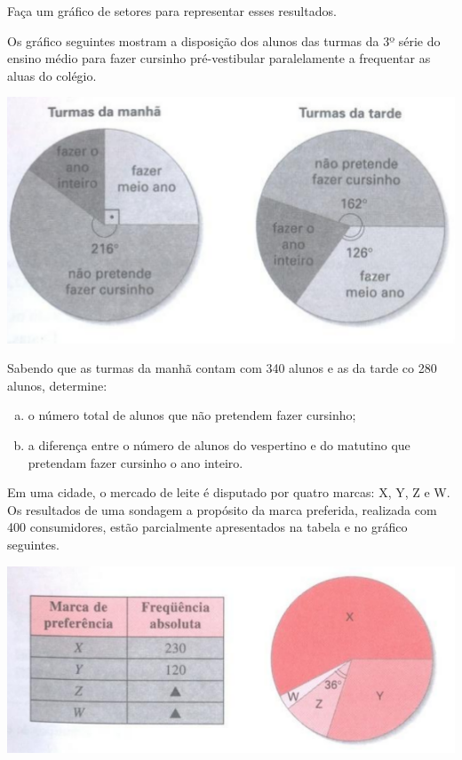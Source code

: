 	Faça um gráfico de setores para representar esses resultados.
	
	\item Os gráfico seguintes mostram a disposição dos alunos das turmas da 3º série do ensino médio para fazer cursinho pré-vestibular paralelamente a frequentar as aluas do colégio.
	
	\begin{center}
		\includegraphics[scale=0.7]{figuras/fig111.png}
	\end{center}	
	
	Sabendo que as turmas da manhã contam com 340 alunos e as da tarde co 280 alunos, determine:
	\begin{enumerate}[a)]
		\item o número total de alunos que não pretendem fazer cursinho;
		\item a diferença entre o número de alunos do vespertino e do matutino que pretendam fazer cursinho o ano inteiro.
	\end{enumerate}
	
	\item Em uma cidade, o mercado de leite é disputado por quatro marcas: X, Y, Z e W. Os resultados de uma sondagem a propósito da marca preferida, realizada com 400 consumidores, estão parcialmente apresentados na tabela e no gráfico seguintes.
	
	\begin{center}
		\includegraphics[scale=0.7]{figuras/fig112.png}
	\end{center}	
	
